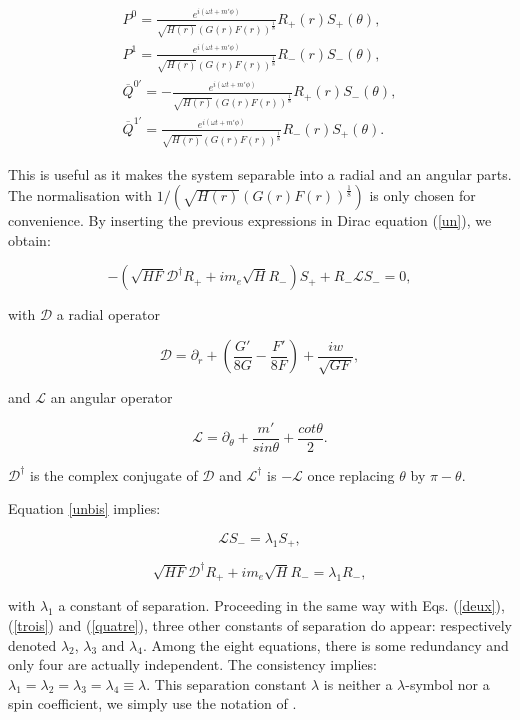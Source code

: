 \documentclass[twocolumn,amsmath,amssymb,prl,10pt,nofootinbib,superscriptaddress]{revtex4}
\def\be{\begin{equation}}
\def\ee{\end{equation}}
\def\bea{\begin{eqnarray}}
\def\eea{\end{eqnarray}}
\begin{document}
\bea
P^0 =\frac{e^{i(\omega t+m'\phi)}}{\sqrt{H(r)}(G(r)F(r))^{\tfrac{1}{8}}} R_+(r) S_+(\theta) , \\    
P^1 =\frac{e^{i(\omega t+m'\phi)}}{\sqrt{H(r)}(G(r)F(r))^{\tfrac{1}{8}}} R_-(r) S_-(\theta) ,  \\
  \overline{Q}^{0'}=-\frac{e^{i(\omega t+m'\phi)}}{\sqrt{H(r)}(G(r)F(r))^{\tfrac{1}{8}}} R_+(r) S_-(\theta),  \\    
\overline{Q}^{1'}=\frac{e^{i(\omega t+m'\phi)}}{\sqrt{H(r)}(G(r)F(r))^{\tfrac{1}{8}}} R_-(r) S_+(\theta)  .
\eea
 
This is useful as it makes the system separable into a radial and an angular parts. The normalisation with $1/(\sqrt{H(r)}(G(r)F(r))^{\tfrac{1}{8}})$ is only chosen for convenience. By inserting the previous expressions in Dirac equation (\ref{un}), we obtain:

\be 
- (\sqrt{HF}\mathcal{D}^{\dag} R_+  + i m_e \sqrt{H}R_-) S_+ + R_-\mathcal{L}S_- =0,
\label{unbis}
\ee

\noindent with $\mathcal{D}$ a radial operator

\be 
\mathcal{D}= \partial _r +  \left( \frac{G'}{8G} - \frac{F'}{8F}  \right) + \frac{iw}{\sqrt{GF}},
  \ee
  
\noindent and $\mathcal{L}$ an angular operator
 
 \be 
\mathcal{L}=  \partial _{\theta}+ \frac{m'}{sin \theta} + \frac{cot \theta}{2}. 
\ee


\noindent $\mathcal{D}^{\dag}$ is the complex conjugate of $\mathcal{D}$ and $\mathcal{L}^{\dag}$ is $-\mathcal{L}$ once replacing $\theta$ by $\pi - \theta $. 

Equation \ref{unbis} implies:

\be
\mathcal{L}S_- = \lambda _1 S_+,
\ee

\be
\sqrt{HF}\mathcal{D}^{\dag} R_+  + i m_e \sqrt{H}R_- = \lambda _1 R_-,
\ee

\noindent with $\lambda _1$ a constant of separation. Proceeding in the same way with Eqs. (\ref{deux}), (\ref{trois}) and (\ref{quatre}), three other constants of separation do appear: respectively denoted $\lambda _2$, $\lambda _3$ and $\lambda _4$. Among the eight equations, there is some redundancy and only four are actually independent. The consistency implies: $\lambda _1=\lambda _2=\lambda _3=\lambda _4 \equiv \lambda$. This separation constant $\lambda$ is neither a $\lambda$-symbol nor a spin coefficient, we simply use the  notation of \cite{Chandrasekhar:1985kt}.\\
\end{document}
